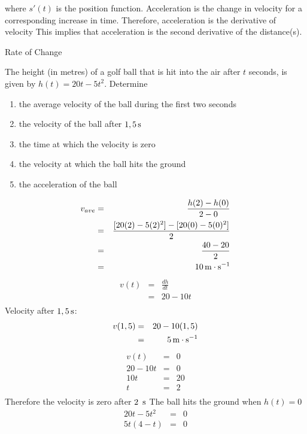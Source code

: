 where $s'(t)$ is the position function. Acceleration is the change in velocity for a corresponding increase in time.  Therefore, acceleration is the derivative of velocity   This implies that acceleration is the second derivative of the distance(s).

\begin{wex}{Rate of Change}{The height (in metres) of a golf ball that is hit into the air after $t$ seconds, is given by $h(t)= 20t-5t^2$.  Determine
\begin{enumerate}
\item{the average velocity of the ball during the first two seconds}
\item{the velocity of the ball after $1,5\,\mathrm{s}$}
\item{the time at which the velocity is zero}
\item{the velocity at which the ball hits the ground}
\item{the acceleration of the ball}
\end{enumerate}
}{
\begin{eqnarray*}
v_{ave}&=& \frac{h(2)-h(0)}{2-0}\\
&=& \frac{[20(2)-5(2)^2]-[20(0)- 5(0)^2]}{2}\\
&=& \frac{40-20}{2}\\
&=& 10 \,\mathrm{m \cdot s^{-1}}\\
\end{eqnarray*}
\begin{eqnarray*}
v(t)&=&\frac{dh}{dt}\\
&=& 20 - 10t\\
\end{eqnarray*}
Velocity after $1,5\,\mathrm{s}$:
\begin{eqnarray*}
v(1,5)&=& 20 - 10(1,5)\\
&=& 5 \,\mathrm{m \cdot s^{-1}}\\
\end{eqnarray*}
\begin{eqnarray*}
v(t) &=& 0\\
20 - 10t &=& 0\\
10t &=& 20\\
t &=& 2\\
\end{eqnarray*}
Therefore the velocity is zero after $2~\,\mathrm{s}$
The ball hits the ground when $h(t) = 0$
\begin{eqnarray*}
20t - 5t^2 &=& 0\\
5t(4-t) &=& 0\\

\end{eqnarray*}}
\end{wex}
